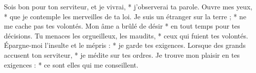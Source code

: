 Sois bon pour ton serviteur, et je vivrai, *
j’observerai ta parole.
\versseparator
Ouvre mes yeux, *
que je contemple les merveilles de ta loi.
\versseparator
Je suis un étranger sur la terre ; *
ne me cache pas tes volontés.
\versseparator
Mon âme a brûlé de désir *
en tout temps pour tes décisions.
\versseparator
Tu menaces les orgueilleux, les maudits, *
ceux qui fuient tes volontés.
\versseparator
Épargne-moi l’insulte et le mépris : *
je garde tes exigences.
\versseparator
Lorsque des grands accusent ton serviteur, *
je médite sur tes ordres.
\versseparator
Je trouve mon plaisir en tes exigences : *
ce sont elles qui me conseillent.

